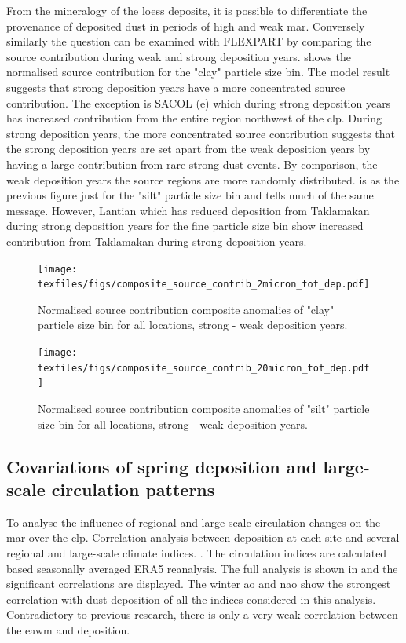 From the mineralogy of the loess deposits, it is possible to differentiate the provenance of deposited dust in periods of high and weak \acrshort{mar}. Conversely similarly the question can be examined with FLEXPART by comparing the source contribution during weak and strong deposition years.  
 shows the normalised source contribution for the "clay" particle size bin. The model result suggests that strong deposition years have a more concentrated source contribution. 
The exception is SACOL (e) which during strong deposition years has increased contribution from the entire region northwest of the \acrshort{clp}. 
During strong deposition years, the more concentrated source contribution suggests that the strong deposition years are set apart from the weak deposition years by having a large contribution from rare strong dust events. 
By comparison, the weak deposition years the source regions are more randomly distributed.  is as the previous figure just for the "silt" particle size bin and tells much of the same message. 
However, Lantian which has reduced deposition from Taklamakan during strong deposition years for the fine particle size bin show increased contribution from Taklamakan during strong deposition years.     
\begin{figure}[hptb]
    \centering
    \texttt{[image: texfiles/figs/composite\_source\_contrib\_2micron\_tot\_dep.pdf]}
    \caption{Normalised source contribution composite anomalies of "clay" particle size bin for all locations, strong - weak deposition years.}
    \label{fig:source_contrib2mmu_anomalies}
\end{figure}

\begin{figure}[hptb]
    \centering
    \texttt{[image: texfiles/figs/composite\_source\_contrib\_20micron\_tot\_dep.pdf]}
    \caption{Normalised source contribution composite anomalies of "silt" particle size bin for all locations, strong - weak deposition years.}
    \label{fig:source_contrib20mmu_anomalies}
\end{figure}

\subsection{Covariations of spring deposition and large-scale circulation patterns}
To analyse the influence of regional and large scale circulation changes on the \acrshort{mar} over the \acrshort{clp}. 
Correlation analysis between deposition at each site and several regional and large-scale climate indices. .
The circulation indices are calculated based seasonally averaged ERA5 reanalysis. 
The full analysis is shown in  and the significant correlations are displayed. 
The winter \acrshort{ao} and \acrshort{nao} show the strongest correlation with dust deposition of all the indices considered in this analysis. 
Contradictory to previous research, there is only a very weak correlation between the \acrshort{eawm} and deposition. 

